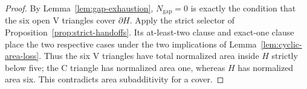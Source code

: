 \begin{proof}
By Lemma~\ref{lem:gap-exhaustion}, $N_{\mathrm{gap}}=0$ is exactly the
condition that the six open V triangles cover $\partial H$.  Apply the
strict selector of Proposition~\ref{prop:strict-handoffs}.  Its at-least-two
clause and exact-one clause place the two respective cases under the two
implications of Lemma~\ref{lem:cyclic-area-loss}.  Thus the six V triangles
have total normalized area inside $H$ strictly below five; the C triangle has
normalized area one, whereas $H$ has normalized area six.  This contradicts
area subadditivity for a cover.
\end{proof}
